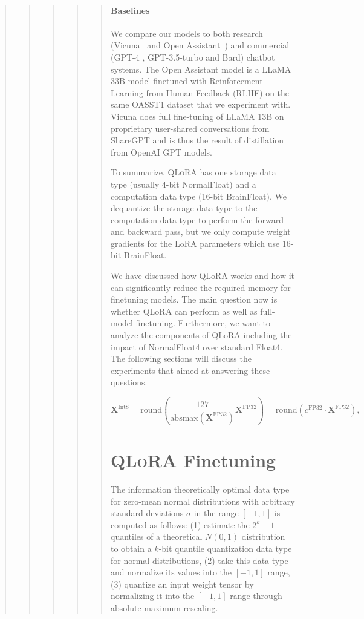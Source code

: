 \begin{quote}
\begin{quote}
\begin{quote}
\begin{quote}
\begin{quote}
\paragraph{Baselines} We compare our models to both research (Vicuna~\citep{vicuna2023} and Open Assistant~\citep{kopf2023openassistant}) and commercial (GPT-4 \citep{openai2023gpt}, GPT-3.5-turbo and Bard) chatbot systems. The Open Assistant model is a LLaMA 33B model finetuned with Reinforcement Learning from Human Feedback (RLHF) on the same OASST1 dataset that we experiment with. Vicuna does full fine-tuning of LLaMA 13B on proprietary user-shared conversations from ShareGPT and is thus the result of distillation from OpenAI GPT models.

To summarize, \textsc{QLoRA} has one storage data type (usually 4-bit NormalFloat) and a computation data type (16-bit BrainFloat). We dequantize the storage data type to the computation data type to perform the forward and backward pass, but we only compute weight gradients for the LoRA parameters which use 16-bit BrainFloat.

We have discussed how QLoRA works and how it can significantly reduce the required memory for finetuning models. The main question now is whether QLoRA can perform as well as full-model finetuning. Furthermore, we want to analyze the components of QLoRA including the impact of NormalFloat4 over standard Float4. The following sections will discuss the experiments that aimed at answering these questions.

\begin{equation}
    \mathbf{X}^{ \text{Int8}} = \text{round}\left( \frac{127}{{\text{absmax}}(\mathbf{X}^{{\text{FP32}}})}\mathbf{X}^{{\text{FP32}}} \right) = \text{round}(c^{\text{FP32}}\cdot \mathbf{X}^{{\text{FP32}}}),
\end{equation}

\section{\textsc{QLoRA} Finetuning}

The information theoretically optimal data type for zero-mean normal distributions with arbitrary standard deviations $\sigma$ in the range $[-1, 1]$ is computed as follows: (1) estimate the $2^k+1$ quantiles of a theoretical $N(0, 1)$ distribution to obtain a $k$-bit quantile quantization data type for normal distributions, (2) take this data type and normalize its values into the $[-1, 1]$ range, (3) quantize an input weight tensor by normalizing it into the $[-1, 1]$ range through absolute maximum rescaling. 


\end{quote}
\end{quote}
\end{quote}
\end{quote}
\end{quote}
